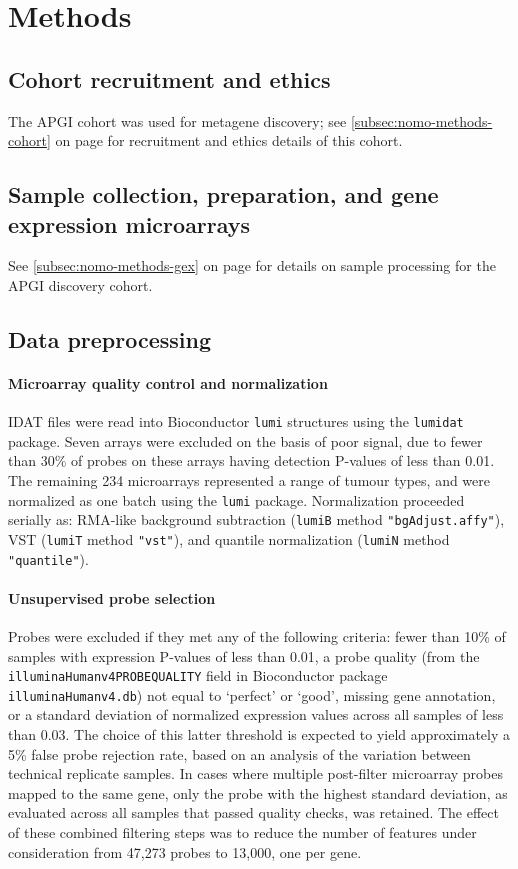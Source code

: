 \documentclass[dissertation.tex]{subfiles}
\begin{document}
\section{Methods}
\subsection{Cohort recruitment and ethics}
The \gls{APGI} cohort was used for metagene discovery; see \ref{subsec:nomo-methods-cohort} on page \pageref{subsec:nomo-methods-cohort} for recruitment and ethics details of this cohort.

\subsection{Sample collection, preparation, and gene expression microarrays}
See \ref{subsec:nomo-methods-gex} on page \pageref{subsec:nomo-methods-gex} for details on sample processing for the \gls{APGI} discovery cohort.

\subsection{Data preprocessing}
\paragraph{Microarray quality control and normalization}
\gls{IDAT} files were read into Bioconductor \texttt{lumi} structures using the \texttt{lumidat} package.  Seven arrays were excluded on the basis of poor signal, due to fewer than 30\% of probes on these arrays having detection P-values of less than 0.01.  The remaining 234 microarrays represented a range of tumour types, and were normalized as one batch using the \texttt{lumi} package.  Normalization proceeded serially as: RMA-like background subtraction (\texttt{lumiB} method \texttt{"bgAdjust.affy"}), \gls{VST} (\texttt{lumiT} method \texttt{"vst"}), and quantile normalization (\texttt{lumiN} method \texttt{"quantile"}).

\paragraph{Unsupervised probe selection}
Probes were excluded if they met any of the following criteria: fewer than 10\% of samples with expression P-values of less than 0.01, a probe quality (from the \texttt{illuminaHumanv4PROBEQUALITY} field in Bioconductor package \texttt{illuminaHumanv4.db}) not equal to `perfect' or `good', missing gene annotation, or a standard deviation of normalized expression values across all samples of less than 0.03.  The choice of this latter threshold is expected to yield approximately a 5\% false probe rejection rate, based on an analysis of the variation between technical replicate samples.  In cases where multiple post-filter microarray probes mapped to the same gene, only the probe with the highest standard deviation, as evaluated across all samples that passed quality checks, was retained.  The effect of these combined filtering steps was to reduce the number of features under consideration from 47,273 probes to 13,000, one per gene.
\end{document}
